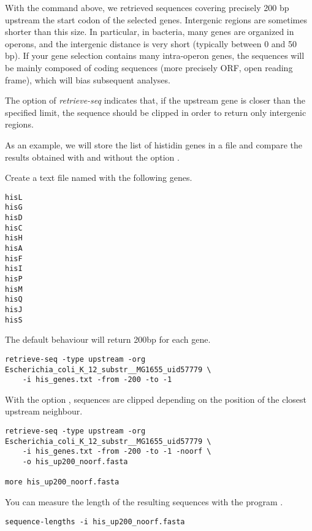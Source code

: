 With the command above, we retrieved sequences covering precisely 200
bp upstream the start codon of the selected genes. Intergenic regions
are sometimes shorter than this size. In particular, in bacteria, many
genes are organized in operons, and the intergenic distance is very
short (typically between 0 and 50 bp). If your gene selection contains
many intra-operon genes, the sequences will be mainly composed of
coding sequences (more precisely ORF, open reading frame), which will
bias subsequent analyses.

The option  of \textit{retrieve-seq} indicates that, if
the upstream gene is closer than the specified limit, the sequence
should be clipped in order to return only intergenic regions.

As an example, we will store the list of histidin genes in a file and
compare the results obtained with and without the option
.

Create a text file named  with the following
genes.

\begin{footnotesize}
\begin{verbatim}
hisL
hisG
hisD
hisC
hisH
hisA
hisF
hisI
hisP
hisM
hisQ
hisJ
hisS
\end{verbatim}
\end{footnotesize}

The default behaviour will return 200bp for each gene. 

\begin{lstlisting}
retrieve-seq -type upstream -org Escherichia_coli_K_12_substr__MG1655_uid57779 \
    -i his_genes.txt -from -200 -to -1
\end{lstlisting}

With the option , sequences are clipped depending on
the position of the closest upstream neighbour.

\begin{lstlisting}
retrieve-seq -type upstream -org Escherichia_coli_K_12_substr__MG1655_uid57779 \
    -i his_genes.txt -from -200 -to -1 -noorf \
    -o his_up200_noorf.fasta

more his_up200_noorf.fasta
\end{lstlisting}

You can measure the length of the resulting sequences with the program
.

\begin{lstlisting}
sequence-lengths -i his_up200_noorf.fasta
\end{lstlisting}

